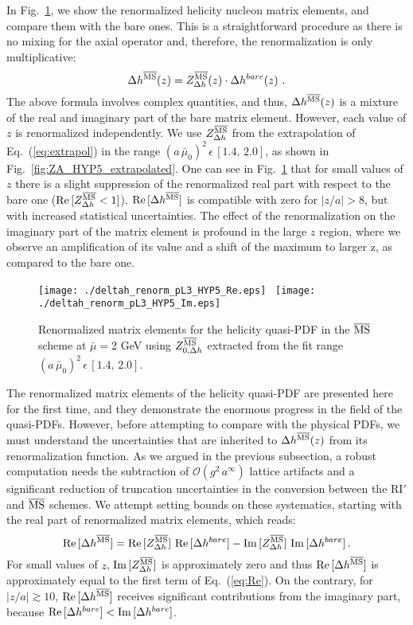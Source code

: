 \documentclass[12pt,tighten,nofootinbib,amssymb,floatfix]{article}
\newcommand{\MSb}{{\overline{\rm MS}}}
\renewcommand{\Re}{{\rm Re}\,}
\renewcommand{\Im}{{\rm Im}\,}
\newcommand{\be}{\begin{equation}}
\newcommand{\ee}{\end{equation}}
\begin{document}
In Fig.~\ref{fig:deltah}, we show the renormalized helicity nucleon matrix elements, and compare them with 
the bare ones. This is a straightforward procedure as there is no mixing for the axial operator and, therefore, 
the renormalization is only multiplicative:
\be
\Delta h^{\MSb} (z) = Z_{\Delta h}^\MSb(z)\cdot \Delta h^{bare}(z)\,\,.
\ee
The above formula involves complex quantities, and thus, $\Delta h^{\MSb} (z)$ is a mixture of the real and imaginary part
of the bare matrix element. However, each value of $z$ is renormalized independently.
We use $Z_{\Delta h}^\MSb$ from the extrapolation of Eq.~(\ref{eq:extrapol}) in the range 
$(a\,\bar\mu_0)^2\,\epsilon\, [1.4,\,2.0]$, as shown in Fig.~\ref{fig:ZA_HYP5_extrapolated}. 
One can see in Fig.~\ref{fig:deltah} that for small values of $z$ there is a slight suppression of 
the renormalized real part with respect to the bare one ($\Re [Z_{\Delta h}^\MSb<1]$). 
$\Re[\Delta h^{\MSb}]$ is compatible with zero for $|z/a|{>}8$, but with increased statistical 
uncertainties. The effect of the renormalization on the imaginary part of the matrix element is
profound in the large $z$ region, where we observe an amplification of its value and a shift of the
maximum to larger z, as compared to the bare one.
\bigskip
\begin{figure}[h]
\centering
\texttt{[image: ./deltah\_renorm\_pL3\_HYP5\_Re.eps]}\,\,\,
\texttt{[image: ./deltah\_renorm\_pL3\_HYP5\_Im.eps]}
\vspace*{-0.3cm}
\begin{minipage}{15cm}
\hspace*{3cm}
\caption{\small{Renormalized matrix elements for the helicity quasi-PDF in the 
$\MSb$ scheme at $\bar\mu{=}$2 GeV using $Z_{0, \Delta h}^{\MSb}$
extracted from the fit range $(a\,\bar\mu_0)^2\,\epsilon\, [1.4,\,2.0]$.}}
\label{fig:deltah} 
\end{minipage}
\end{figure}

\vspace*{0.5cm}
The renormalized matrix elements of the helicity quasi-PDF are presented here for the first time, and they demonstrate the 
enormous progress in the field of the quasi-PDFs. However, before attempting to compare with the physical PDFs, we must 
understand the uncertainties that are inherited to $\Delta h^{\MSb} (z) $ from its renormalization function.
As we argued in the previous subsection, a robust computation needs the subtraction of $\mathcal{O}(g^2\,a^\infty)$ 
lattice artifacts and a significant reduction of truncation uncertainties in the conversion between the RI$'$ and $\MSb$ schemes.
We attempt setting bounds on these systematics, starting with the real part of renormalized matrix elements, which reads:
\be
\label{eq:Re}
\Re[\Delta h^\MSb]=\Re[Z_{\Delta h}^{\MSb}]\,\, \Re[\Delta h^{bare}]-\Im[Z_{\Delta h}^{\MSb}]\,\, \Im[\Delta h^{bare}]\,.
\ee
For small values of $z$, $\Im[Z_{\Delta h}^{\MSb}]$ is approximately zero and thus $\Re[\Delta h^\MSb]$ is approximately equal to the first term of Eq.~(\ref{eq:Re}).
On the contrary, for $|z/a|\gtrsim10$, $\Re[\Delta h^\MSb]$ receives significant contributions from the imaginary part, because $\Re[\Delta h^{bare}]<\Im[\Delta h^{bare}]$.
\end{document}
